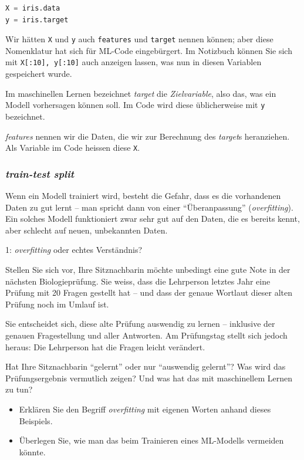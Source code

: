 \begin{lpu}
\begin{lstlisting}[language=Python]
X = iris.data
y = iris.target
\end{lstlisting}

Wir hätten \texttt{X} und \texttt{y} auch \texttt{features} und \texttt{target} nennen können; aber diese Nomenklatur hat sich für ML-Code eingebürgert. Im Notizbuch können Sie sich mit \texttt{X[:10], y[:10]} auch anzeigen lassen, was nun in diesen Variablen gespeichert wurde.

\begin{theorie}
    Im maschinellen Lernen bezeichnet \textit{target} die \textit{Zielvariable}, also das, was ein Modell vorhersagen können soll. Im Code wird diese üblicherweise mit \texttt{y} bezeichnet.

    \textit{features} nennen wir die Daten, die wir zur Berechnung des \textit{target}s heranziehen. Als Variable im Code heissen diese \texttt{X}.
\end{theorie}

\subsubsection*{\textit{train-test split}}

Wenn ein Modell trainiert wird, besteht die Gefahr, dass es die vorhandenen Daten zu gut lernt – man spricht dann von einer ``Überanpassung'' (\textit{overfitting}). Ein solches Modell funktioniert zwar sehr gut auf den Daten, die es bereits kennt, aber schlecht auf neuen, unbekannten Daten. 

\begin{aufgabe}{1: \textit{overfitting} oder echtes Verständnis?}

Stellen Sie sich vor, Ihre Sitznachbarin möchte unbedingt eine gute Note in der nächsten Biologieprüfung. Sie weiss, dass die Lehrperson letztes Jahr eine Prüfung mit 20 Fragen gestellt hat – und dass der genaue Wortlaut dieser alten Prüfung noch im Umlauf ist.

Sie entscheidet sich, diese alte Prüfung auswendig zu lernen – inklusive der genauen Fragestellung und aller Antworten. Am Prüfungstag stellt sich jedoch heraus: Die Lehrperson hat die Fragen leicht verändert.

Hat Ihre Sitznachbarin ``gelernt'' oder nur ``auswendig gelernt''? Was wird das Prüfungsergebnis vermutlich zeigen? Und was hat das mit maschinellem Lernen zu tun?

\begin{itemize}
  \item Erklären Sie den Begriff \textit{overfitting} mit eigenen Worten anhand dieses Beispiels.
  \item Überlegen Sie, wie man das beim Trainieren eines ML-Modells vermeiden könnte.
\end{itemize}
\end{aufgabe}


\end{lpu}
